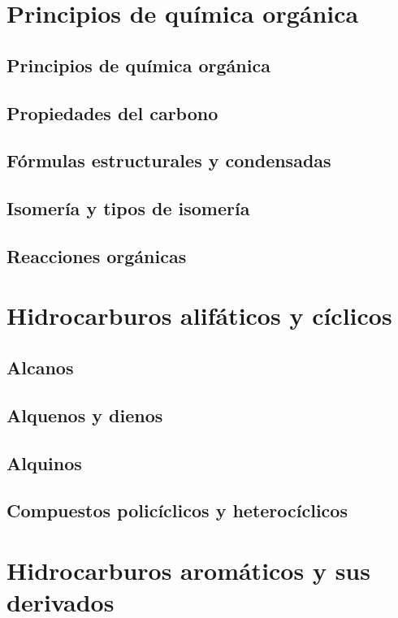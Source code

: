 \documentclass{../summarie}
\begin{document}
\Portada
\Indice
\fancystyle
\onehalfspacing


\part{Principios de química orgánica}
    \chapter{Principios de química orgánica}
    \chapter{Propiedades del carbono}
    \chapter{Fórmulas estructurales y condensadas}
    \chapter{Isomería y tipos de isomería}
        
    \chapter{Reacciones orgánicas}
        

\part{Hidrocarburos alifáticos y cíclicos}
    \chapter{Alcanos}
    \chapter{Alquenos y dienos}
    \chapter{Alquinos}
    \chapter{Compuestos policíclicos y heterocíclicos}

\part{Hidrocarburos aromáticos y sus derivados}
\end{document}
